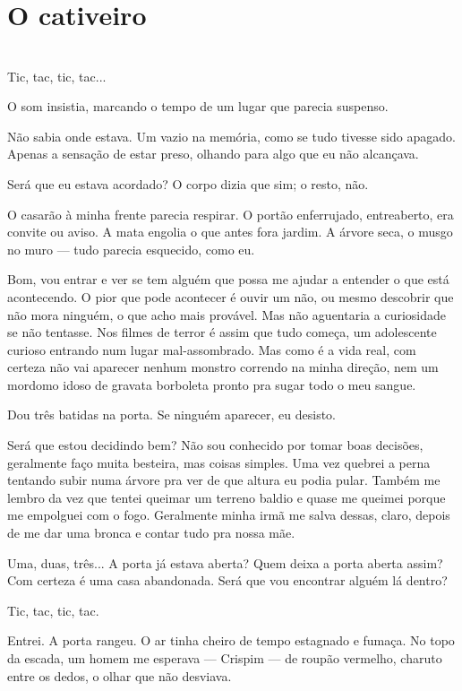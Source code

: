 \newpage

\ifdefined\useChapters
\chapter{O cativeiro}
\else
\chapter{}
\fi

Tic, tac, tic, tac...

O som insistia, marcando o tempo de um lugar que parecia suspenso.

Não sabia onde estava. Um vazio na memória, como se tudo tivesse sido apagado. Apenas a sensação de estar preso, olhando para algo que eu não alcançava.

Será que eu estava acordado? O corpo dizia que sim; o resto, não.

O casarão à minha frente parecia respirar. O portão enferrujado, entreaberto, era convite ou aviso. A mata engolia o que antes fora jardim. A árvore seca, o musgo no muro — tudo parecia esquecido, como eu.

Bom, vou entrar e ver se tem alguém que possa me ajudar a entender o que está acontecendo. O pior que pode acontecer é ouvir um não, ou mesmo descobrir que não mora ninguém, o que acho mais provável. Mas não aguentaria a curiosidade se não tentasse. Nos filmes de terror é assim que tudo começa, um adolescente curioso entrando num lugar mal-assombrado. Mas como é a vida real, com certeza não vai aparecer nenhum monstro correndo na minha direção, nem um mordomo idoso de gravata borboleta pronto pra sugar todo o meu sangue.

Dou três batidas na porta. Se ninguém aparecer, eu desisto.

Será que estou decidindo bem? Não sou conhecido por tomar boas decisões, geralmente faço muita besteira, mas coisas simples. Uma vez quebrei a perna tentando subir numa árvore pra ver de que altura eu podia pular. Também me lembro da vez que tentei queimar um terreno baldio e quase me queimei porque me empolguei com o fogo. Geralmente minha irmã me salva dessas, claro, depois de me dar uma bronca e contar tudo pra nossa mãe.

Uma, duas, três... A porta já estava aberta? Quem deixa a porta aberta assim? Com certeza é uma casa abandonada. Será que vou encontrar alguém lá dentro?

Tic, tac, tic, tac.

Entrei. A porta rangeu. O ar tinha cheiro de tempo estagnado e fumaça. No topo da escada, um homem me esperava — Crispim — de roupão vermelho, charuto entre os dedos, o olhar que não desviava.

